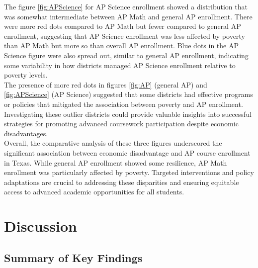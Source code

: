 \documentclass[sn-mathphys-num]{sn-jnl}%
\theoremstyle{thmstyleone}%
\theoremstyle{thmstyletwo}%
\theoremstyle{thmstylethree}%
\begin{document}
{The figure \ref{fig:APScience} for AP Science enrollment showed a distribution that was somewhat intermediate between AP Math and general AP enrollment. There were more red dots compared to AP Math but fewer compared to general AP enrollment, suggesting that AP Science enrollment was less affected by poverty than AP Math but more so than overall AP enrollment. Blue dots in the AP Science figure were also spread out, similar to general AP enrollment, indicating some variability in how districts managed AP Science enrollment relative to poverty levels.\\

The presence of more red dots in figures \ref{fig:AP} (general AP) and \ref{fig:APScience} (AP Science) suggested that some districts had effective programs or policies that mitigated the association between poverty and AP enrollment. Investigating these outlier districts could provide valuable insights into successful strategies for promoting advanced coursework participation despite economic disadvantages.\\

Overall, the comparative analysis of these three figures underscored the significant association between economic disadvantage and AP course enrollment in Texas. While general AP enrollment showed some resilience, AP Math enrollment was particularly affected by poverty. Targeted interventions and policy adaptations are crucial to addressing these disparities and ensuring equitable access to advanced academic opportunities for all students.


\section{Discussion}\label{sec:Discussion}

\subsection{Summary of Key Findings}

}
\end{document}
